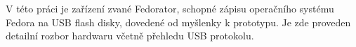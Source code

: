 V této práci je zařízení zvané Fedorator, schopné zápisu operačního systému Fedora na USB flash disky, dovedené od myšlenky k prototypu.  Je zde proveden detailní rozbor hardwaru včetně přehledu USB protokolu.

